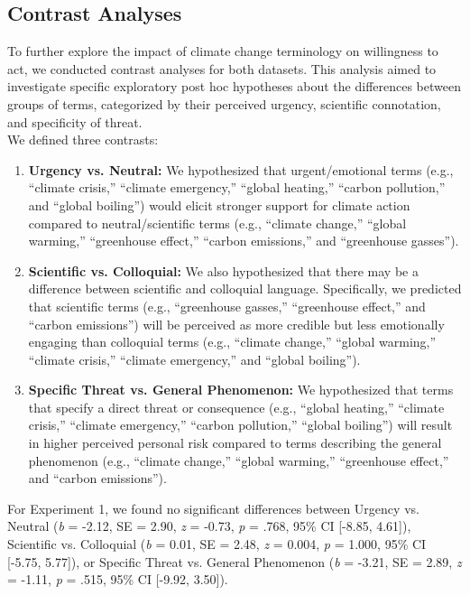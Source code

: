       \subsection{Contrast Analyses}
To further explore the impact of climate change terminology on willingness to act, we conducted contrast analyses for both datasets. This analysis aimed to investigate specific exploratory post hoc hypotheses about the differences between groups of terms, categorized by their perceived urgency, scientific connotation, and specificity of threat.\\

 We defined three contrasts:\\

\begin{enumerate}
    \item \textbf{Urgency vs. Neutral:} We hypothesized that urgent/emotional terms (e.g., “climate crisis,” “climate emergency,” “global heating,” “carbon pollution,” and “global boiling”) would elicit stronger support for climate action compared to neutral/scientific terms (e.g., “climate change,” “global warming,” “greenhouse effect,” “carbon emissions,” and “greenhouse gasses”).

    \item \textbf{Scientific vs. Colloquial:} We also hypothesized that there may be a difference between scientific and colloquial language. Specifically, we predicted that scientific terms (e.g., “greenhouse gasses,” “greenhouse effect,” and “carbon emissions”) will be perceived as more credible but less emotionally engaging than colloquial terms (e.g., “climate change,” “global warming,” “climate crisis,” “climate emergency,” and “global boiling”).

    \item \textbf{Specific Threat vs. General Phenomenon:} We hypothesized that terms that specify a direct threat or consequence (e.g., “global heating,” “climate crisis,” “climate emergency,” “carbon pollution,” “global boiling”) will result in higher perceived personal risk compared to terms describing the general phenomenon (e.g., “climate change,” “global warming,” “greenhouse effect,” and “carbon emissions”). 
\end{enumerate}

 For Experiment 1, we found no significant differences between Urgency vs. Neutral (\textit{b} = -2.12, SE = 2.90, \textit{z} = -0.73, \textit{p }= .768, 95\% CI [-8.85, 4.61]), Scientific vs. Colloquial (\textit{b} = 0.01, SE = 2.48, \textit{z} = 0.004, \textit{p} = 1.000, 95\% CI [-5.75, 5.77]), or Specific Threat vs. General Phenomenon (\textit{b} = -3.21, SE = 2.89, \textit{z} = -1.11, \textit{p} = .515, 95\% CI [-9.92, 3.50]). \\

